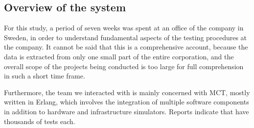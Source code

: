%





\subsection{Overview of the system}

For this study, a period of seven weeks was spent at an office of the company in Sweden, in order to understand fundamental aspects of the testing procedures at the company.
It cannot be said that this is a comprehensive account, because the data is extracted from only one small part of the entire corporation, and the overall scope of the projects being conducted is too large for full comprehension in such a short time frame.


Furthermore, the team we interacted with is mainly concerned with MCT, mostly written in Erlang, which involves the integration of multiple software components in addition to hardware and infrastructure simulators.
Reports indicate that  have thousands of tests each.



%
%
%
